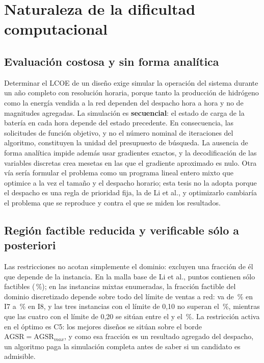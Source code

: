 \section{Naturaleza de la dificultad computacional}

\subsection{Evaluación costosa y sin forma analítica}

Determinar el LCOE de un diseño exige simular la operación del sistema durante un año completo con resolución horaria, porque tanto la producción de hidrógeno como la energía vendida a la red dependen del despacho hora a hora y no de magnitudes agregadas. La simulación es \textbf{secuencial}: el estado de carga de la batería en cada hora depende del estado precedente. En consecuencia, las solicitudes de función objetivo, y no el número nominal de iteraciones del algoritmo, constituyen la unidad del presupuesto de búsqueda. La ausencia de forma analítica impide además usar gradientes exactos, y la decodificación de las variables discretas crea mesetas en las que el gradiente aproximado es nulo. Otra vía sería formular el problema como un programa lineal entero mixto que optimice a la vez el tamaño y el despacho horario; esta tesis no la adopta porque el despacho es una regla de prioridad fija, la de Li et al., y optimizarlo cambiaría el problema que se reproduce y contra el que se miden los resultados.

\subsection{Región factible reducida y verificable sólo a posteriori}
\label{sec:region_factible}

Las restricciones no acotan simplemente el dominio: excluyen una fracción de él que depende de la instancia. En la malla base de Li et al., \BaseEvaluated{} puntos contienen sólo \BaseFeasible{} factibles (\BaseFeasiblePct\,\%); en las instancias mixtas enumeradas, la fracción factible del dominio discretizado depende sobre todo del límite de ventas a red:
va de \BFGFeasiblePct\,\% en I7 a \BFHFeasiblePct\,\% en I8, y las tres instancias con el límite de 0,10 no superan el \FeasibleShareTightMax\,\%, mientras que las cuatro con el límite de 0,20 se sitúan entre el \FeasibleShareMidMin{} y el \FeasibleShareMidMax\,\%. La restricción activa en el óptimo es C5: los mejores diseños se sitúan sobre el borde $\mathrm{AGSR}=\mathrm{AGSR}_{max}$, y como esa fracción es un resultado agregado del despacho, un algoritmo paga la simulación completa antes de saber si un candidato es admisible.

